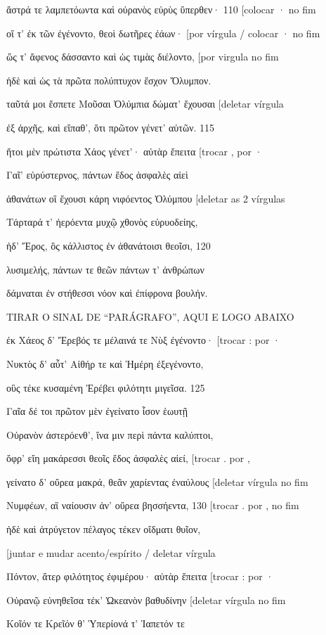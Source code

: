 ἄστρά τε λαμπετόωντα καὶ οὐρανὸς εὐρὺς ὕπερθεν· 110 {[}colocar · no fim

οἵ τ' ἐκ τῶν ἐγένοντο, θεοὶ δωτῆρες ἐάων· {[}por vírgula / colocar · no
fim

ὥς τ' ἄφενος δάσσαντο καὶ ὡς τιμὰς διέλοντο, {[}por virgula no fim

ἠδὲ καὶ ὡς τὰ πρῶτα πολύπτυχον ἔσχον Ὄλυμπον.

ταῦτά μοι ἔσπετε Μοῦσαι Ὀλύμπια δώματ' ἔχουσαι {[}deletar vírgula

ἐξ ἀρχῆς, καὶ εἴπαθ', ὅτι πρῶτον γένετ' αὐτῶν. 115

ἤτοι μὲν πρώτιστα Χάος γένετ'· αὐτὰρ ἔπειτα {[}trocar , por ·

Γαῖ' εὐρύστερνος, πάντων ἕδος ἀσφαλὲς αἰεὶ

ἀθανάτων οἳ ἔχουσι κάρη νιφόεντος Ὀλύμπου {[}deletar as 2 vírgulas

Τάρταρά τ' ἠερόεντα μυχῷ χθονὸς εὐρυοδείης,

ἠδ' Ἔρος, ὃς κάλλιστος ἐν ἀθανάτοισι θεοῖσι, 120

λυσιμελής, πάντων τε θεῶν πάντων τ' ἀνθρώπων

δάμναται ἐν στήθεσσι νόον καὶ ἐπίφρονα βουλήν.

TIRAR O SINAL DE ``PARÁGRAFO'', AQUI E LOGO ABAIXO

ἐκ Χάεος δ' Ἔρεβός τε μέλαινά τε Νὺξ ἐγένοντο· {[}trocar : por ·

Νυκτὸς δ' αὖτ' Αἰθήρ τε καὶ Ἡμέρη ἐξεγένοντο,

οὓς τέκε κυσαμένη Ἐρέβει φιλότητι μιγεῖσα. 125

Γαῖα δέ τοι πρῶτον μὲν ἐγείνατο ἶσον ἑωυτῇ

Οὐρανὸν ἀστερόενθ', ἵνα μιν περὶ πάντα καλύπτοι,

ὄφρ' εἴη μακάρεσσι θεοῖς ἕδος ἀσφαλὲς αἰεί, {[}trocar . por ,

γείνατο δ' οὔρεα μακρά, θεᾶν χαρίεντας ἐναύλους {[}deletar vírgula no
fim

Νυμφέων, αἳ ναίουσιν ἀν' οὔρεα βησσήεντα, 130 {[}trocar . por , no fim

ἠδὲ καὶ ἀτρύγετον πέλαγος τέκεν οἴδματι θυῖον,

{[}juntar e mudar acento/espírito / deletar vírgula

Πόντον, ἄτερ φιλότητος ἐφιμέρου· αὐτὰρ ἔπειτα {[}trocar : por ·

Οὐρανῷ εὐνηθεῖσα τέκ' Ὠκεανὸν βαθυδίνην {[}deletar vírgula no fim

Κοῖόν τε Κρεῖόν θ' Ὑπερίονά τ' Ἰαπετόν τε

